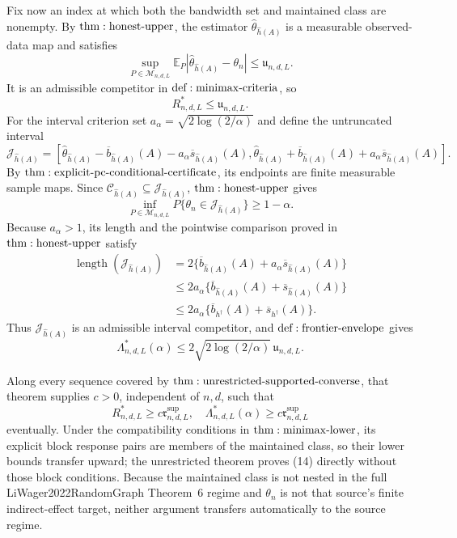 Fix now an index at which both the bandwidth set and maintained class are nonempty.  By \({\rm thm:honest\text{-}upper}\), the estimator \(\widehat\theta_{\widehat h(A)}\) is a measurable observed-data map and satisfies
\[
 \sup_{P\in\mathcal M_{n,d,L}}
 \mathbb E_P|\widehat\theta_{\widehat h(A)}-\theta_n|
 \leq\mathfrak u_{n,d,L}.
\tag{8}
\]
It is an admissible competitor in \({\rm def:minimax\text{-}criteria}\), so
\[
 R^*_{n,d,L}\leq\mathfrak u_{n,d,L}.
\tag{9}
\]
For the interval criterion set \(a_\alpha=\sqrt{2\log(2/\alpha)}\) and define the untruncated interval
\[
 \mathcal J_{\widehat h(A)}=
 \left[
 \widehat\theta_{\widehat h(A)}-\overline b_{\widehat h(A)}(A)-a_\alpha\overline s_{\widehat h(A)}(A),
 \widehat\theta_{\widehat h(A)}+\overline b_{\widehat h(A)}(A)+a_\alpha\overline s_{\widehat h(A)}(A)
 \right].
\tag{10}
\]
By \({\rm thm:explicit\text{-}pc\text{-}conditional\text{-}certificate}\), its endpoints are finite measurable sample maps.  Since \(\mathcal C_{\widehat h(A)}\subseteq\mathcal J_{\widehat h(A)}\), \({\rm thm:honest\text{-}upper}\) gives
\[
 \inf_{P\in\mathcal M_{n,d,L}}P\{\theta_n\in\mathcal J_{\widehat h(A)}\}
 \geq1-\alpha.
\tag{11}
\]
Because \(a_\alpha>1\), its length and the pointwise comparison proved in \({\rm thm:honest\text{-}upper}\) satisfy
\[
\begin{aligned}
 \operatorname{length}(\mathcal J_{\widehat h(A)})
 &=2\{\overline b_{\widehat h(A)}(A)+a_\alpha\overline s_{\widehat h(A)}(A)\}\\
 &\leq2a_\alpha\{\overline b_{\widehat h(A)}(A)+\overline s_{\widehat h(A)}(A)\}\\
 &\leq2a_\alpha\{\overline b_{h^\dagger}(A)+\overline s_{h^\dagger}(A)\}.
\end{aligned}
\tag{12}
\]
Thus \(\mathcal J_{\widehat h(A)}\) is an admissible interval competitor, and \({\rm def:frontier\text{-}envelope}\) gives
\[
 \Lambda^*_{n,d,L}(\alpha)
 \leq2\sqrt{2\log(2/\alpha)}\,\mathfrak u_{n,d,L}.
\tag{13}
\]

Along every sequence covered by \({\rm thm:unrestricted\text{-}supported\text{-}converse}\), that theorem supplies \(c>0\), independent of \(n,d\), such that
\[
 R^*_{n,d,L}\geq c\mathfrak r^{\mathrm{sup}}_{n,d,L},
 \quad
 \Lambda^*_{n,d,L}(\alpha)\geq c\mathfrak r^{\mathrm{sup}}_{n,d,L}
\tag{14}
\]
eventually.  Under the compatibility conditions in \({\rm thm:minimax\text{-}lower}\), its explicit block response pairs are members of the maintained class, so their lower bounds transfer upward; the unrestricted theorem proves (14) directly without those block conditions.  Because the maintained class is not nested in the full LiWager2022RandomGraph Theorem~6 regime and \(\theta_n\) is not that source's finite indirect-effect target, neither argument transfers automatically to the source regime.

